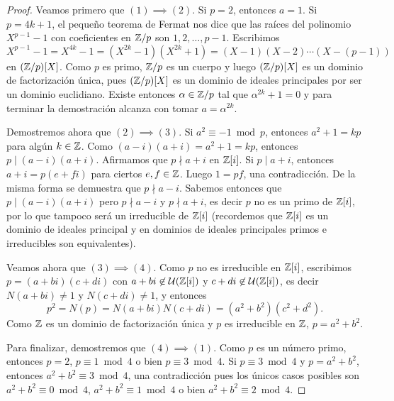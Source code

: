 \begin{proof}
Veamos primero que $(1)\implies (2)$. Si $p=2$, entonces $a=1$. Si $p=4k+1$, el pequeño teorema de Fermat nos dice que 
las raíces del polinomio $X^{p-1}-1$ 
con coeficientes en $\mathbb{Z}/p$ son $1,2,\dots,p-1$. Escribimos
\[
X^{p-1}-1=X^{4k}-1=(X^{2k}-1)(X^{2k}+1)=(X-1)(X-2)\cdots (X-(p-1))
\]
en $(\mathbb{Z}/p)[X]$. Como $p$ es primo, $\mathbb{Z}/p$ es un cuerpo y luego $(\mathbb{Z}/p)[X]$ es un dominio de factorización única, pues
$(\mathbb{Z}/p)[X]$ es un dominio de ideales principales por ser un dominio euclidiano. Existe entonces $\alpha\in\mathbb{Z}/p$
tal que $\alpha^{2k}+1=0$ y para terminar la demostración alcanza con tomar $a=\alpha^{2k}$. 

Demostremos ahora que $(2)\implies(3)$. Si $a^2\equiv -1\bmod p$, entonces $a^2+1=kp$ para algún $k\in\mathbb{Z}$. Como
$(a-i)(a+i)=a^2+1=kp$, entonces $p\mid (a-i)(a+i)$. Afirmamos que $p\nmid a+i$ en $\mathbb{Z}[i]$. Si $p\mid a+i$, entonces
$a+i=p(e+fi)$ para ciertos $e,f\in\mathbb{Z}$. Luego $1=pf$, una contradicción. De la misma forma se demuestra que $p\nmid a-i$. 
Sabemos entonces que $p\mid (a-i)(a+i)$ pero $p\nmid a-i$ y $p\nmid a+i$, es decir $p$ no es un primo de $\mathbb{Z}[i]$, por lo que 
tampoco será un irreducible de $\mathbb{Z}[i]$ (recordemos que $\mathbb{Z}[i]$ es un dominio de ideales principal y en dominios de ideales
principales primos e irreducibles son equivalentes).  

Veamos ahora que $(3)\implies(4)$. Como $p$ no es irreducible en $\mathbb{Z}[i]$, escribimos
$p=(a+bi)(c+di)$ con $a+bi\not\in\mathcal{U}(\mathbb{Z}[i])$ y $c+di\not\in\mathcal{U}(\mathbb{Z}[i])$, 
es decir $N(a+bi)\ne 1$ y $N(c+di)\ne 1$, y entonces
\[
p^2=N(p)=N(a+bi)N(c+di)=(a^2+b^2)(c^2+d^2).
\]
Como $\mathbb{Z}$ es un dominio de factorización única y $p$ es irreducible en $\mathbb{Z}$, $p=a^2+b^2$. 

Para finalizar, demostremos que $(4)\implies(1)$. Como $p$ es un número primo, entonces $p=2$, $p\equiv 1\bmod 4$ o bien $p\equiv 3\bmod 4$. Si $p\equiv 3\bmod 4$ y $p=a^2+b^2$, entonces
$a^2+b^2\equiv 3\bmod 4$, una contradicción pues los únicos casos posibles son $a^2+b^2\equiv 0\bmod 4$, $a^2+b^2\equiv 1\bmod 4$ o bien $a^2+b^2\equiv 2\bmod 4$.     
\end{proof}

%
%
%	
	
